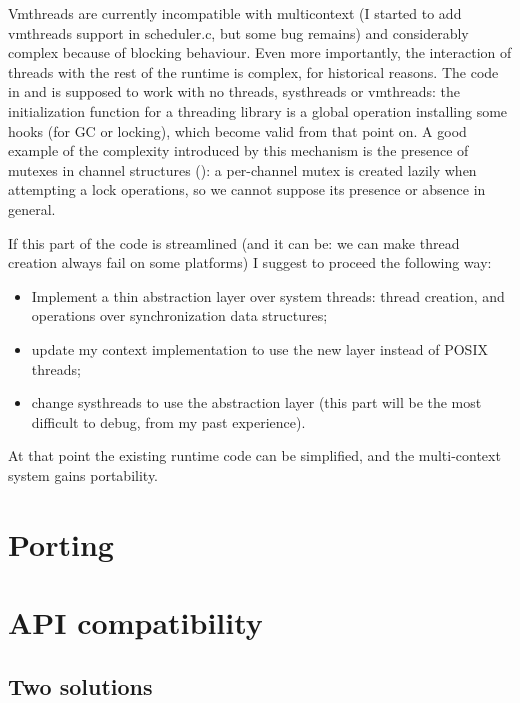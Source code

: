 \documentclass[a4paper,twoside,draft,12pt]{article}
\begin{document}
Vmthreads are currently incompatible with multicontext (I started to
add vmthreads support in scheduler.c, but some bug remains) and
considerably complex because of blocking behaviour.  Even more
importantly, the interaction of threads with the rest of the runtime
is complex, for historical reasons.  The code in  and
 is supposed to work with no threads, systhreads or
vmthreads: the initialization function for a threading library is a
global operation installing some hooks (for GC or locking), which
become valid from that point on.  A good example of the complexity
introduced by this mechanism is the presence of mutexes in channel
structures (): a per-channel mutex is created
lazily when attempting a lock operations, so we cannot suppose its
presence or absence in general.

If this part of the code is streamlined (and it can be: we can make
thread creation always fail on some platforms) I suggest to proceed
the following way:

\begin{itemize}
\item Implement a thin abstraction layer over system threads: thread
  creation, and operations over synchronization data structures;
\item update my context implementation to use the new layer instead of
  POSIX threads;
\item change systhreads to use the abstraction layer (this part will
  be the most difficult to debug, from my past experience).
\end{itemize}

At that point the existing runtime code can be simplified, and the
multi-context system gains portability.


\section{Porting}


\FILL

\section{API compatibility}
\subsection{Two solutions}
\end{document}
